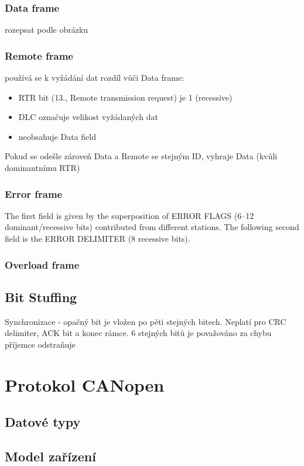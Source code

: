 \documentclass[
  field=ainfk,
  biblatex,
  glossaries,
  index
]{kidiplom}
\begin{document}
\subsubsection{Data frame}
rozepsat podle obrázku
\subsubsection{Remote frame}
používá se k vyžádání dat
rozdíl vůči Data frame:
\begin{itemize}
	\item RTR bit (13., Remote transmission request) je 1 (recessive)
	\item DLC označuje velikost vyžádaných dat
	\item neobsahuje Data field
\end{itemize}
Pokud se odešle zároveň Data a Remote se stejným ID, vyhraje Data (kvůli dominantnímu RTR)

\subsubsection{Error frame}
The first field is given by the superposition of ERROR FLAGS (6–12 dominant/recessive bits) contributed from different stations.
The following second field is the ERROR DELIMITER (8 recessive bits).

\subsubsection{Overload frame}

\subsection{Bit Stuffing}
Synchronizace - opačný bit je vložen po pěti stejných bitech. Neplatí pro CRC delimiter, ACK bit a konec rámce. 6 stejných bitů je považováno za chybu
příjemce odstraňuje

\section{Protokol CANopen}

\subsection{Datové typy}

\subsection{Model zařízení}
\end{document}
